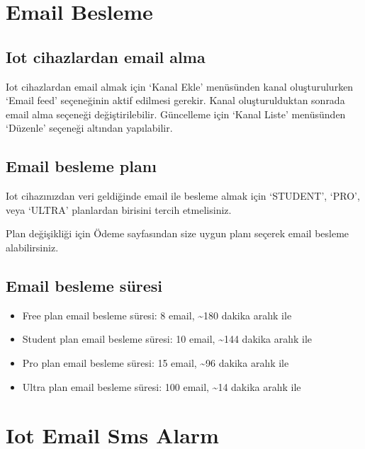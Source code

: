 \documentclass[letterpaper,10pt,turkish]{sphinxmanual}
\begin{document}
\section{Email Besleme}
\label{\detokenize{email-feed:email-feed}}\label{\detokenize{email-feed::doc}}\label{\detokenize{email-feed:email-besleme}}

\subsection{Iot cihazlardan email alma}
\label{\detokenize{email-feed:iot-cihazlardan-email-alma}}
Iot cihazlardan email almak için `Kanal Ekle' menüsünden kanal oluşturulurken `Email feed'
seçeneğinin aktif edilmesi gerekir. Kanal oluşturulduktan sonrada email alma seçeneği
değiştirilebilir. Güncelleme için `Kanal Liste' menüsünden `Düzenle' seçeneği altından yapılabilir.


\subsection{Email besleme planı}
\label{\detokenize{email-feed:email-besleme-plani}}
Iot cihazınızdan veri geldiğinde email ile besleme almak için `STUDENT', `PRO',
veya `ULTRA' planlardan birisini tercih etmelisiniz.

Plan değişikliği için Ödeme sayfasından size uygun planı seçerek email besleme alabilirsiniz.


\subsection{Email besleme süresi}
\label{\detokenize{email-feed:email-besleme-suresi}}\begin{itemize}
\item {} 
Free plan email besleme süresi: 8 email, \textasciitilde{}180 dakika aralık ile

\item {} 
Student plan email besleme süresi: 10 email, \textasciitilde{}144 dakika aralık ile

\item {} 
Pro plan email besleme süresi: 15 email, \textasciitilde{}96 dakika aralık ile

\item {} 
Ultra plan email besleme süresi: 100 email, \textasciitilde{}14 dakika aralık ile

\end{itemize}


\section{Iot Email Sms Alarm}
\label{\detokenize{email-sms-alert::doc}}\label{\detokenize{email-sms-alert:iot-email-sms-alarm}}\label{\detokenize{email-sms-alert:email-sms-alert}}
\end{document}
